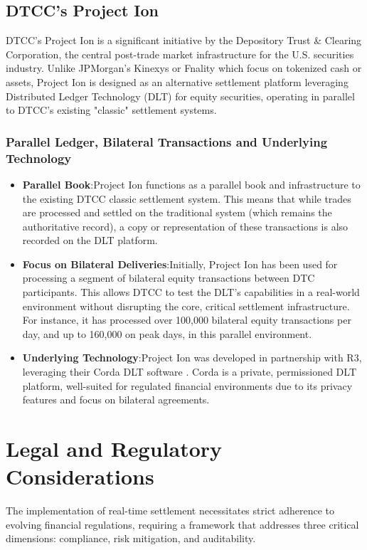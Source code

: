 \documentclass[conference]{IEEEtran}
\begin{document}
\subsection{DTCC's Project Ion}
DTCC's Project Ion is a significant initiative by the Depository Trust \& Clearing Corporation, the central post-trade market infrastructure for the U.S. securities industry. Unlike JPMorgan's Kinexys or Fnality which focus on tokenized cash or assets, Project Ion is designed as an alternative settlement platform leveraging Distributed Ledger Technology (DLT) for equity securities, operating in parallel to DTCC's existing "classic" settlement systems.
\subsubsection{Parallel Ledger, Bilateral Transactions and Underlying Technology}
\begin{itemize}
    \item  \textbf{Parallel Book}:Project Ion functions as a parallel book and infrastructure to the existing DTCC classic settlement system. This means that while trades are processed and settled on the traditional system (which remains the authoritative record), a copy or representation of these transactions is also recorded on the DLT platform\cite{b9}\cite{b10}.
    \item \textbf{Focus on Bilateral Deliveries}:Initially, Project Ion has been used for processing a segment of bilateral equity transactions between DTC participants. 
   This allows DTCC to test the DLT's capabilities in a real-world environment without disrupting the core, critical settlement infrastructure. For instance, it has processed over 100,000 bilateral equity transactions per day, and up to 160,000 on peak days, in this parallel environment\cite{b9}.
    \item \textbf{Underlying Technology}:Project Ion was developed in partnership with R3, leveraging their Corda DLT software\cite{b9} \cite{b11}. Corda is a private, permissioned DLT platform, well-suited for regulated financial environments due to its privacy features and focus on bilateral agreements.
\end{itemize}


\section{Legal and Regulatory Considerations}
The implementation of real-time settlement necessitates strict adherence to evolving financial regulations, requiring a framework that addresses three critical dimensions: compliance, risk mitigation, and auditability.
\end{document}
